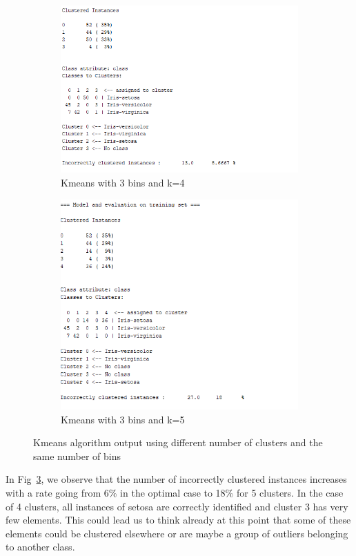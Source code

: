\documentclass[letterpaper,12pt]{article}
\begin{document}
\begin{figure}[H]
\begin{subfigure}{.5\textwidth}
  \centering
  \includegraphics[width=.8\linewidth]{3bins_4cl_output}  
  \caption{Kmeans with 3 bins and k=4}
  \label{fig:sub-first_3}
\end{subfigure}
\begin{subfigure}{.5\textwidth}
  \centering
  \includegraphics[width=.8\linewidth]{3bins_5cl_output}  
  \caption{Kmeans with 3 bins and k=5}
  \label{fig:sub-second_3}
\end{subfigure}
\caption{Kmeans algorithm output using different number of clusters and the same number of bins}
\label{fig:fig_3}
\end{figure}

In Fig~\ref{fig:fig_3}, we observe that the number of incorrectly clustered instances increases with a rate going from 6\% in the optimal case to 18\% for 5 clusters. In the case of 4 clusters, all instances of setosa are correctly identified and cluster 3 has very few elements. This could lead us to think already at this point that some of these elements could be clustered elsewhere or are maybe a group of outliers belonging to another class. 
\end{document}
